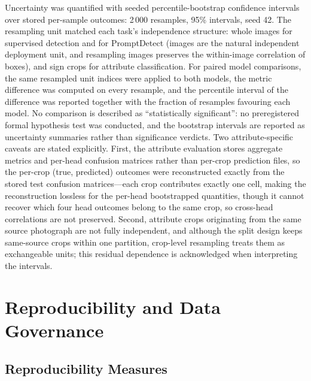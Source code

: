 Uncertainty was quantified with seeded percentile-bootstrap confidence intervals over stored per-sample outcomes: 2\,000 resamples, 95\% intervals, seed 42. The resampling unit matched each task's independence structure: whole images for supervised detection and for PromptDetect (images are the natural independent deployment unit, and resampling images preserves the within-image correlation of boxes), and sign crops for attribute classification. For paired model comparisons, the same resampled unit indices were applied to both models, the metric difference was computed on every resample, and the percentile interval of the difference was reported together with the fraction of resamples favouring each model. No comparison is described as ``statistically significant'': no preregistered formal hypothesis test was conducted, and the bootstrap intervals are reported as uncertainty summaries rather than significance verdicts. Two attribute-specific caveats are stated explicitly. First, the attribute evaluation stores aggregate metrics and per-head confusion matrices rather than per-crop prediction files, so the per-crop (true, predicted) outcomes were reconstructed exactly from the stored test confusion matrices---each crop contributes exactly one cell, making the reconstruction lossless for the per-head bootstrapped quantities, though it cannot recover which four head outcomes belong to the same crop, so cross-head correlations are not preserved. Second, attribute crops originating from the same source photograph are not fully independent, and although the split design keeps same-source crops within one partition, crop-level resampling treats them as exchangeable units; this residual dependence is acknowledged when interpreting the intervals.

\section{Reproducibility and Data Governance}
\label{sec:reproducibility}

\subsection{Reproducibility Measures}

